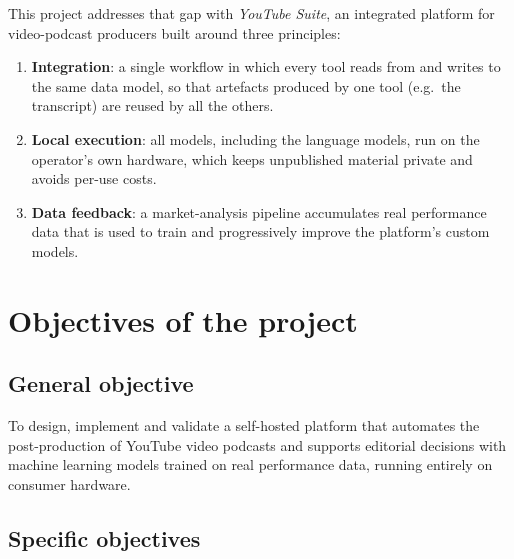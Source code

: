 \documentclass[ENG]{TFUOC}
\begin{document}
This project addresses that gap with \textit{YouTube Suite}, an integrated platform for video-podcast producers built around three principles:
\begin{enumerate}
\item \textbf{Integration}: a single workflow in which every tool reads from and writes to the same data model, so that artefacts produced by one tool (e.g.\ the transcript) are reused by all the others.
\item \textbf{Local execution}: all models, including the language models, run on the operator's own hardware, which keeps unpublished material private and avoids per-use costs.
\item \textbf{Data feedback}: a market-analysis pipeline accumulates real performance data that is used to train and progressively improve the platform's custom models.
\end{enumerate}

\section{Objectives of the project}
\label{s:objectives}

\subsection*{General objective}

To design, implement and validate a self-hosted platform that automates the post-production of YouTube video podcasts and supports editorial decisions with machine learning models trained on real performance data, running entirely on consumer hardware.

\subsection*{Specific objectives}
\end{document}
